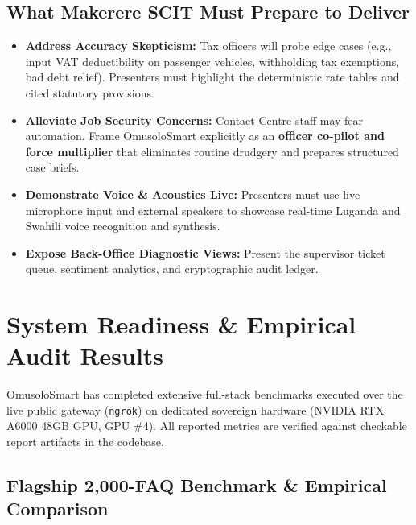 \documentclass[10pt,a4paper]{article}
\begin{document}
\subsection{What Makerere SCIT Must Prepare to Deliver}
\begin{itemize}
  \item \textbf{Address Accuracy Skepticism:} Tax officers will probe edge cases (e.g., input VAT deductibility on passenger vehicles, withholding tax exemptions, bad debt relief). Presenters must highlight the deterministic rate tables and cited statutory provisions.
  \item \textbf{Alleviate Job Security Concerns:} Contact Centre staff may fear automation. Frame OmusoloSmart explicitly as an \textbf{officer co-pilot and force multiplier} that eliminates routine drudgery and prepares structured case briefs.
  \item \textbf{Demonstrate Voice \& Acoustics Live:} Presenters must use live microphone input and external speakers to showcase real-time Luganda and Swahili voice recognition and synthesis.
  \item \textbf{Expose Back-Office Diagnostic Views:} Present the supervisor ticket queue, sentiment analytics, and cryptographic audit ledger.
\end{itemize}

\section{System Readiness \& Empirical Audit Results}

OmusoloSmart has completed extensive full-stack benchmarks executed over the live public gateway (\texttt{ngrok}) on dedicated sovereign hardware (NVIDIA RTX A6000 48GB GPU, GPU \#4). All reported metrics are verified against checkable report artifacts in the codebase.

\subsection{Flagship 2,000-FAQ Benchmark \& Empirical Comparison}
\end{document}
